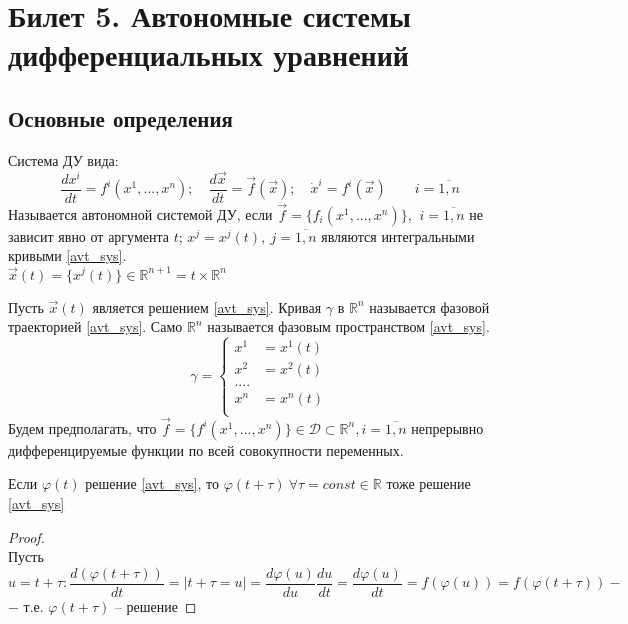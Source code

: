 \section{Билет 5. Автономные системы дифференциальных уравнений}

\subsection{Основные определения}

Система ДУ вида: 
\begin{equation}\label{avt_sys}
	\frac{dx^i}{dt} = f^i(x^1, ..., x^n); \quad \frac{d\vec{x}}{dt} = \vec{f}(\vec{x}); \quad 	\dot{x}^i = f^i(\vec{x}) \quad \quad i = \overline{1, n}
\end{equation}
Называется автономной системой ДУ, если $ \vec{f} = \{f_i(x^1, ..., x^n)\} $,  $\ i = \overline{1, n}$ не зависит явно от аргумента $ t $; $ x^j = x^j(t), \ j = \overline{1, n} $ являются интегральными кривыми \eqref{avt_sys}. \\ $\vec{x}(t) = \{ x^j(t) \} \in \mathbb{R}^{n+1} = t \times \mathbb{R}^n$
\begin{definition}
	Пусть $ \vec{x}(t) $ является решением \eqref{avt_sys}. Кривая $ \gamma $ в $ \mathbb{R}^n $ называется фазовой траекторией \eqref{avt_sys}. Само $ \mathbb{R}^n $ называется фазовым пространством \eqref{avt_sys}.
	\begin{equation}\label{gamma_sys}
		\gamma = \left\{
			\begin{aligned}
				x^1 &= x^1(t) \\
				x^2 &=x^2(t) \\
				.... \\
				x^n &= x^n(t) \\
			\end{aligned}
		\right.
	\end{equation}
	Будем предполагать, что $ \vec{f} = \{ f^i(x^1, ..., x^n) \} \in \mathscr{D} \subset \mathbb{R}^n, i = \overline{1, n} $ непрерывно дифференцируемые функции по всей совокупности переменных.
\end{definition}

\begin{theorem}
	Если $ \varphi(t) $ решение \eqref{avt_sys}, то $ \varphi(t + \tau) \ \forall \tau = const \in \mathbb{R}$ тоже решение \eqref{avt_sys}
\end{theorem}

\begin{proof}
	\ \\
	Пусть $ u = t + \tau: \dfrac{d(\varphi(t + \tau))}{dt} = | t + \tau = u | = \dfrac{d \varphi(u)}{du} \dfrac{du}{dt} = \dfrac{d \varphi(u)}{dt} = f(\varphi(u)) = f(\varphi(t + \tau))-$ \\ $-$ т.е. $\varphi(t + \tau)$ -- решение
\end{proof}

